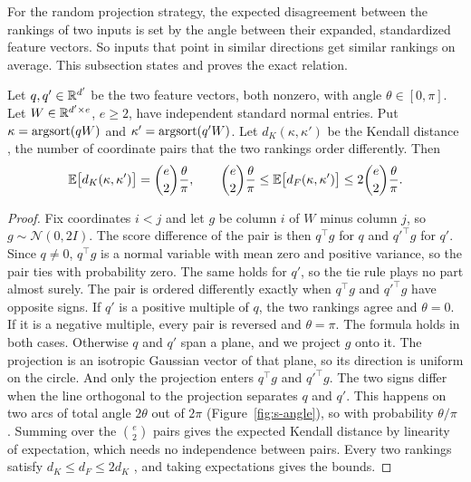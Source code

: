 For the random projection strategy, the expected disagreement between the rankings of two inputs is set by the angle between their expanded, standardized feature vectors. So inputs that point in similar directions get similar rankings on average. This subsection states and proves the exact relation.

Let $q,q'\in\mathbb{R}^{d'}$ be the two feature vectors, both nonzero, with angle $\theta\in[0,\pi]$. Let $W\in\mathbb{R}^{d'\times e}$, $e\ge2$, have independent standard normal entries. Put $\kappa=\mathrm{argsort}(qW)$ and $\kappa'=\mathrm{argsort}(q'W)$. Let $d_K(\kappa,\kappa')$ be the Kendall distance \citep{kendall1938}, the number of coordinate pairs that the two rankings order differently. Then
\begin{equation}\label{eq:angle}
\mathbb{E}\bigl[d_K(\kappa,\kappa')\bigr]=\binom{e}{2}\frac{\theta}{\pi},\qquad \binom{e}{2}\frac{\theta}{\pi}\le\mathbb{E}\bigl[d_F(\kappa,\kappa')\bigr]\le2\binom{e}{2}\frac{\theta}{\pi}.
\end{equation}

\begin{proof}
Fix coordinates $i<j$ and let $g$ be column $i$ of $W$ minus column $j$, so $g\sim\mathcal N(0,2I)$. The score difference of the pair is then $q^{\top}g$ for $q$ and $q'^{\top}g$ for $q'$. Since $q\neq0$, $q^{\top}g$ is a normal variable with mean zero and positive variance, so the pair ties with probability zero. The same holds for $q'$, so the tie rule plays no part almost surely. The pair is ordered differently exactly when $q^{\top}g$ and $q'^{\top}g$ have opposite signs. If $q'$ is a positive multiple of $q$, the two rankings agree and $\theta=0$. If it is a negative multiple, every pair is reversed and $\theta=\pi$. The formula holds in both cases. Otherwise $q$ and $q'$ span a plane, and we project $g$ onto it. The projection is an isotropic Gaussian vector of that plane, so its direction is uniform on the circle. And only the projection enters $q^{\top}g$ and $q'^{\top}g$. The two signs differ when the line orthogonal to the projection separates $q$ and $q'$. This happens on two arcs of total angle $2\theta$ out of $2\pi$ (Figure~\ref{fig:s-angle}), so with probability $\theta/\pi$ \citep{charikar2002similarity}. Summing over the $\binom{e}{2}$ pairs gives the expected Kendall distance by linearity of expectation, which needs no independence between pairs. Every two rankings satisfy $d_K\le d_F\le2d_K$ \citep{diaconis1977footrule}, and taking expectations gives the bounds.
\end{proof}

